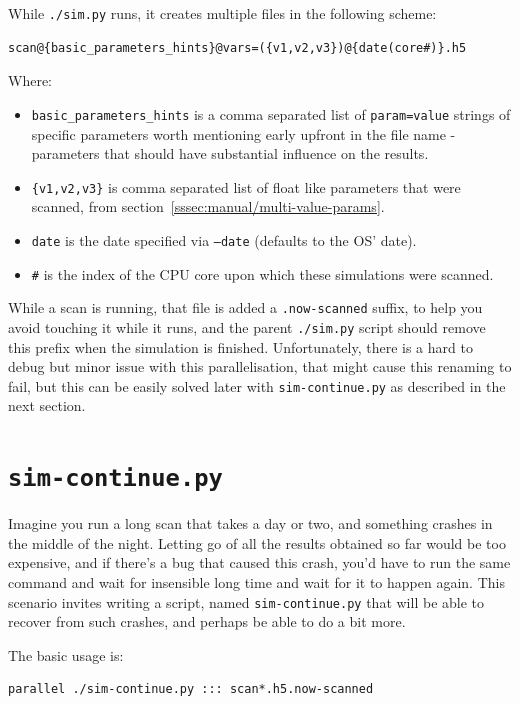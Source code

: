 While \texttt{./sim.py} runs, it creates multiple files in the following scheme:
	
\begin{verbatim}
scan@{basic_parameters_hints}@vars=({v1,v2,v3})@{date(core#)}.h5
\end{verbatim}

Where:

\begin{itemize}
	\item \texttt{basic\_parameters\_hints} is a comma separated list of \texttt{param=value} strings of specific parameters worth mentioning early upfront in the file name - parameters that should have substantial influence on the results. 
	\item \texttt{\{v1,v2,v3\}} is comma separated list of float like parameters that were scanned, from section~\ref{sssec:manual/multi-value-params}.
	\item \texttt{date} is the date specified via \texttt{--date} (defaults to the OS' date).
	\item \texttt{\#} is the index of the CPU core upon which these simulations were scanned.
\end{itemize}

While a scan is running, that file is added a \texttt{.now-scanned} suffix, to help you avoid touching it while it runs, and the parent \texttt{./sim.py} script should remove this prefix when the simulation is finished. Unfortunately, there is a hard to debug but minor issue with this parallelisation, that might cause this renaming to fail, but this can be easily solved later with \texttt{sim-continue.py} as described in the next section.

\section{\texttt{sim-continue.py}}\label{ssec:sim-continue}

Imagine you run a long scan that takes a day or two, and something crashes in the middle of the night. Letting go of all the results obtained so far would be too expensive, and if there's a bug that caused this crash, you'd have to run the same command and wait for insensible long time and wait for it to happen again. This scenario invites writing a script, named \texttt{sim-continue.py} that will be able to recover from such crashes, and perhaps be able to do a bit more.

The basic usage is:

\begin{verbatim}
parallel ./sim-continue.py ::: scan*.h5.now-scanned
\end{verbatim}

